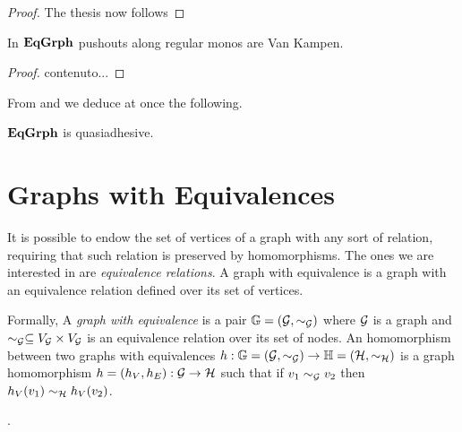 \begin{proof}
The thesis now follows 







\end{proof}


\begin{lemma}\label{lem:vk}
In $\mathbf{EqGrph}$ pushouts along regular monos are Van Kampen.
\end{lemma}
\begin{proof}
	contenuto...
\end{proof}

From  and  we deduce at once the following.

\begin{cor}\label{cor:equi}
	$\mathbf{EqGrph}$ is quasiadhesive.
\end{cor}




\color{black}
\section{Graphs with Equivalences}

It is possible to endow the set of vertices of a graph with any sort of relation, requiring that such relation is preserved by homomorphisms. The ones we are interested in are \emph{equivalence relations}.
A graph with equivalence is a graph with an equivalence relation defined over its set of vertices.

Formally,  A \emph{graph with equivalence} is a pair $\mathbb{G} = (\mathcal{G}, \sim_{\mathcal{G}})$ where $\mathcal{G}$ is a graph and $\sim_{\mathcal{G}} \subseteq V_{\mathcal{G}}\times V_{\mathcal{G}}$ is an equivalence relation over its set of nodes. An homomorphism between two graphs with equivalences $h :\mathbb{G} = (\mathcal{G}, \sim_{\mathcal{G}})\rightarrow \mathbb{H} = (\mathcal{H}, \sim_{\mathcal{H}})$ is a graph homomorphism $h = (h_V, h_E):\mathcal{G} \rightarrow \mathcal{H}$ such that if $v_1 \sim_{\mathcal{G}} v_2$ then $h_V(v_1) \sim_{\mathcal{H}} h_V(v_2)$.

.

